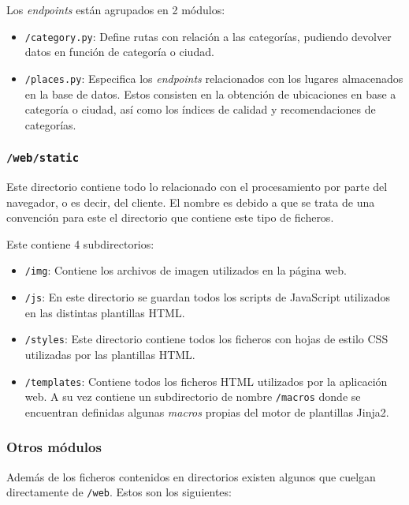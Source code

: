 Los \textit{endpoints} están agrupados en 2 módulos:
\begin{itemize}
	\item \texttt{/category.py}: Define rutas con relación a las categorías, pudiendo devolver datos en función de categoría o ciudad.
	\item \texttt{/places.py}: Especifica los \textit{endpoints} relacionados con los lugares almacenados en la base de datos. Estos consisten en la obtención de ubicaciones en base a categoría o ciudad, así como los índices de calidad y recomendaciones de categorías.
\end{itemize}

\subsubsection{\texttt{/web/static}}
Este directorio contiene todo lo relacionado con el procesamiento por parte del navegador, o es decir, del cliente. El nombre es debido a que se trata de una convención para este el directorio que contiene este tipo de ficheros.

Este contiene 4 subdirectorios:
\begin{itemize}
	\item \texttt{/img}: Contiene los archivos de imagen utilizados en la página web.
	\item \texttt{/js}: En este directorio se guardan todos los scripts de JavaScript utilizados en las distintas plantillas HTML.
	\item \texttt{/styles}: Este directorio contiene todos los ficheros con hojas de estilo CSS utilizadas por las plantillas HTML.
	\item \texttt{/templates}: Contiene todos los ficheros HTML utilizados por la aplicación web. A su vez contiene un subdirectorio de nombre \texttt{/macros} donde se encuentran definidas algunas \textit{macros} propias del motor de plantillas Jinja2.
\end{itemize} 

\subsubsection{Otros módulos}
Además de los ficheros contenidos en directorios existen algunos que cuelgan directamente de \texttt{/web}. Estos son los siguientes:

